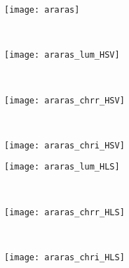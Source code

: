 \begin{figure}[!ht]
    \begin{subfigure}[t]{\textwidth+20pt\relax}
    	\texttt{[image: araras]}
    \end{subfigure} \\    
     
    \begin{subfigure}[t]{\textwidth+20pt\relax}
    	\texttt{[image: araras\_lum\_HSV]}
    \end{subfigure}      
    ~ %
    \begin{subfigure}[b]{0.3\textwidth}
        \texttt{[image: araras\_chrr\_HSV]}
    \end{subfigure}
    ~ %
    \begin{subfigure}[b]{0.3\textwidth}
        \texttt{[image: araras\_chri\_HSV]}
    \end{subfigure} \vspace{5pt}      
    
    \begin{subfigure}[t]{\textwidth+20pt\relax}
    	\texttt{[image: araras\_lum\_HLS]}
    \end{subfigure}     
    ~ %
    \begin{subfigure}[b]{0.3\textwidth}
        \texttt{[image: araras\_chrr\_HLS]}
    \end{subfigure}
    ~ %
    \begin{subfigure}[b]{0.3\textwidth}
        \texttt{[image: araras\_chri\_HLS]}
    \end{subfigure} \vspace{5pt} 
    

\end{figure}
